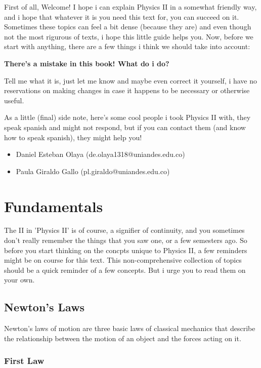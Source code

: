 \documentclass[11pt,fleqn]{book} %
\begin{document}
First of all, Welcome! I hope i can explain Physics II in a somewhat friendly way, and i hope that whatever it is you need this text for, you can succeed on it.
Sometimes these topics can feel a bit dense (because they are) and even though not the most rigurous of texts, i hope this little guide helps you.
Now, before we start with anything, there are a few things i think we should take into account:

\textbf{There's a mistake in this book! What do i do?}

Tell me what it is, just let me know and maybe even correct it yourself, i have
no reservations on making changes in case it happens to be necessary or otherwise useful.

As a little (final) side note, here's some cool people i took Physics II with, they speak spanish and might not respond, but if you can contact them (and know how to speak spanish), they might help you!
\begin{itemize}
    \item Daniel Esteban Olaya (de.olaya1318@uniandes.edu.co)
    \item Paula Giraldo Gallo (pl.giraldo@uniandes.edu.co)
\end{itemize} 

\chapter{Fundamentals}

The II in 'Physics II' is of course, a signifier of continuity, and you sometimes don't really remember the things that you 
saw one, or a few semesters ago. So before you start thinking on the concpts unique to Physics II, a few reminders might be on
course for this text. This non-comprehensive collection of topics should be a quick reminder of a few concepts. But i urge you to 
read them on your own.

\section{Newton's Laws}

Newton's laws of motion are three basic laws of classical mechanics that describe the relationship between the motion of an object and the forces acting on it.

\subsection{First Law}
\end{document}
